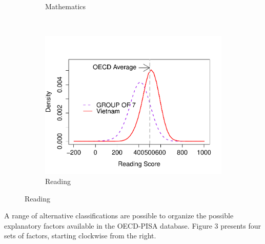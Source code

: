 \documentclass[12pt]{article}%
\begin{document}
\begin{figure}[H]
\begin{subfigure}[b]{0.3\textwidth}
                 \caption{Mathematics}
                 \label{fig:mathematics}
         \end{subfigure}
         ~ %
         \begin{subfigure}[b]{0.28\textwidth}
                 \includegraphics[width=\textwidth]{INTRFIG2c.pdf}
                 \caption{Reading}
                 \label{fig:reading}
         \end{subfigure}
     \end{figure}

A range of alternative classifications are possible to organize the possible explanatory factors available in the OECD-PISA database. Figure 3 presents four sets of factors, starting clockwise from the right.
\end{document}
